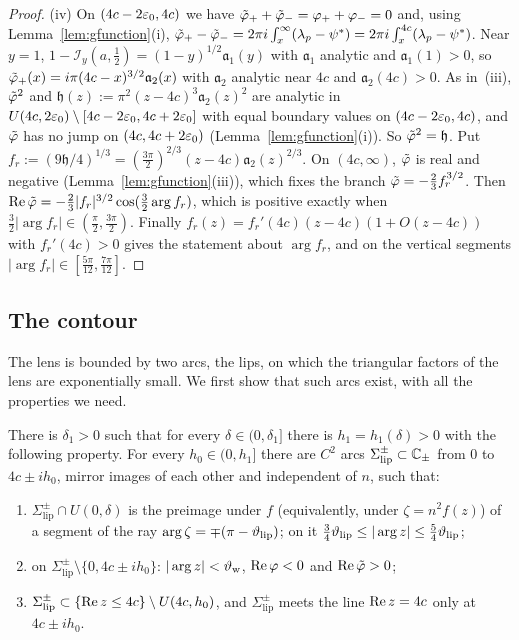 \begin{proof}
(iv) On $(4c-2\varepsilon_0,4c)$ we have $\tilde\varphi_++\tilde\varphi_-=\varphi_++\varphi_-=0$ and, using
Lemma~\ref{lem:gfunction}(i), $\tilde\varphi_+-\tilde\varphi_-=2\pi i\int_x^\infty(\lambda_p-\psi^*)=2\pi i\int_x^{4c}(\lambda_p-\psi^*)$.
Near $y=1$, $1-\mathcal I_y(a,\frac12)=(1-y)^{1/2}\mathfrak a_1(y)$ with $\mathfrak a_1$ analytic and
$\mathfrak a_1(1)>0$, so $\tilde\varphi_+(x)=i\pi(4c-x)^{3/2}\mathfrak a_2(x)$ with $\mathfrak a_2$ analytic near $4c$ and
$\mathfrak a_2(4c)>0$. As in~(iii), $\tilde\varphi^2$ and $\mathfrak h(z):=\pi^2(z-4c)^3\mathfrak a_2(z)^2$ are analytic in
$U(4c,2\varepsilon_0)\setminus[4c-2\varepsilon_0,4c+2\varepsilon_0]$ with equal boundary values on $(4c-2\varepsilon_0,4c)$, and $\tilde\varphi$ has no jump on
$(4c,4c+2\varepsilon_0)$ (Lemma~\ref{lem:gfunction}(i)). So $\tilde\varphi^2=\mathfrak h$. Put
$f_r:=(9\mathfrak h/4)^{1/3}=(\frac{3\pi}{2})^{2/3}(z-4c)\mathfrak a_2(z)^{2/3}$. On $(4c,\infty)$, $\tilde\varphi$ is real and
negative (Lemma~\ref{lem:gfunction}(iii)), which fixes the branch $\tilde\varphi=-\frac23f_r^{3/2}$. Then
$\operatorname{Re}\tilde\varphi=-\frac23|f_r|^{3/2}\cos(\frac32\arg f_r)$, which is positive exactly when $\frac32|\arg f_r|\in(\frac\pi2,\frac{3\pi}2)$.
Finally $f_r(z)=f_r'(4c)(z-4c)(1+O(z-4c))$ with $f_r'(4c)>0$ gives the statement about $\arg f_r$, and on the vertical
segments $|\arg f_r|\in[\frac{5\pi}{12},\frac{7\pi}{12}]$.
\end{proof}

\subsection{The contour}\label{sec:frame-contour}
The lens is bounded by two arcs, the lips, on which the triangular factors of the lens are exponentially small. We first
show that such arcs exist, with all the properties we need.

\begin{lemma}\label{lem:lips}
There is $\delta_1>0$ such that for every $\delta\in(0,\delta_1]$ there is $h_1=h_1(\delta)>0$ with the following
property. For every $h_0\in(0,h_1]$ there are $C^2$ arcs $\Sigma^\pm_{\mathrm{lip}}\subset\mathbb{C}_\pm$ from $0$ to $4c\pm ih_0$,
mirror images of each other and independent of $n$, such that:
\begin{enumerate}
\item[(a)] $\Sigma^\pm_{\mathrm{lip}}\cap U(0,\delta)$ is the preimage under $f$ (equivalently, under $\zeta=n^2f(z)$) of
  a segment of the ray $\arg\zeta=\mp(\pi-\vartheta_{\mathrm{lip}})$; on it $\frac34\vartheta_{\mathrm{lip}}\le|\arg z|\le\frac54\vartheta_{\mathrm{lip}}$;
\item[(b)] on $\Sigma^\pm_{\mathrm{lip}}\setminus\{0,4c\pm ih_0\}$: $|\arg z|<\vartheta_{\mathrm{w}}$, $\operatorname{Re}\varphi<0$ and $\operatorname{Re}\tilde\varphi>0$;
\item[(c)] $\Sigma^\pm_{\mathrm{lip}}\subset\{\operatorname{Re} z\le4c\}\setminus U(4c,h_0)$, and $\Sigma^\pm_{\mathrm{lip}}$ meets the line $\operatorname{Re} z=4c$
  only at $4c\pm ih_0$.
\end{enumerate}
\end{lemma}

